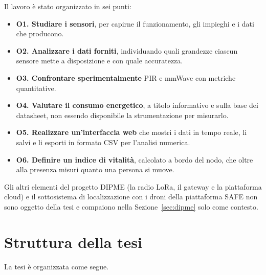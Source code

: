 Il lavoro è stato organizzato in sei punti:

\begin{itemize}
    \item \textbf{O1. Studiare i sensori}, per capirne il funzionamento, gli impieghi e i dati che producono.

    \item \textbf{O2. Analizzare i dati forniti}, individuando quali grandezze ciascun sensore mette a disposizione e con quale accuratezza.

    \item \textbf{O3. Confrontare sperimentalmente} PIR e mmWave con metriche quantitative.

    \item \textbf{O4. Valutare il consumo energetico}, a titolo informativo e sulla base dei datasheet, non essendo disponibile la strumentazione per misurarlo.

    \item \textbf{O5. Realizzare un'interfaccia web} che mostri i dati in tempo reale, li salvi e li esporti in formato CSV per l'analisi numerica.

    \item \textbf{O6. Definire un indice di vitalità}, calcolato a bordo del nodo, che oltre alla presenza misuri quanto una persona si muove.
\end{itemize}

Gli altri elementi del progetto DIPME (la radio LoRa, il gateway e la piattaforma cloud) e il sottosistema di localizzazione con i droni della piattaforma SAFE non sono oggetto della tesi e compaiono nella Sezione~\ref{sec:dipme} solo come contesto.

\section{Struttura della tesi}
\label{sec:struttura}

La tesi è organizzata come segue.

